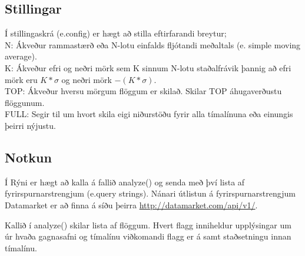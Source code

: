 \documentclass[11pt]{article}
\begin{document}
\subsection{Stillingar}
Í stillingaskrá (e.config) er hægt að stilla eftirfarandi breytur;\\
N: Ákveður rammastærð eða N-lotu einfalds fljótandi meðaltals (e. simple moving average).\\
K: Ákveður efri og neðri mörk sem K sinnum N-lotu staðalfrávik þannig að efri mörk eru $ K*\sigma$ og neðri mörk $-(K*\sigma)$.\\
TOP: Ákveður hversu mörgum flöggum er skilað. Skilar TOP áhugaverðustu flöggunum.\\
FULL: Segir til um hvort skila eigi niðurstöðu fyrir alla tímalínuna eða einungis þeirri nýjustu.
\subsection{Notkun}
Í Rýni er hægt að kalla á fallið analyze() og senda með því lista af fyrirspurnarstrengjum (e.query strings).
Nánari útlistun á fyrirspurnarstrengjum Datamarket er að finna á síðu þeirra \url{http://datamarket.com/api/v1/}.

Kallið í analyze() skilar lista af flöggum. Hvert flagg inniheldur upplýsingar um úr hvaða gagnasafni og 
tímalínu viðkomandi flagg er á samt staðsetningu innan tímalínu.
\end{document}
